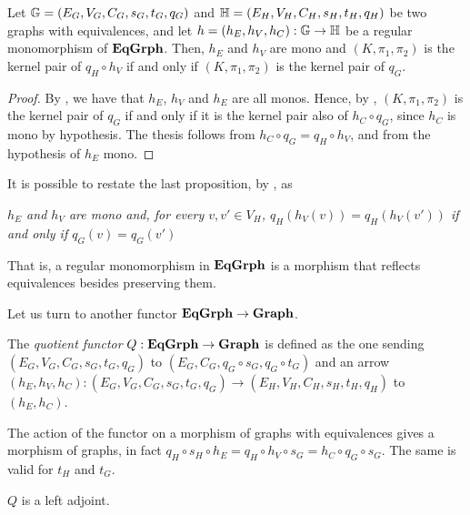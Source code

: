 \begin{prop}
	Let $\mathbb{G} = (E_G, V_G, C_G, s_G, t_G, q_G)$ and $\mathbb{H} = (E_H, V_H, C_H, s_H, t_H, q_H)$ be two graphs with equivalences,
	and let $ h = (h_E, h_V, h_C): \mathbb{G}\to \mathbb{H} $ be a regular monomorphism of $\mathbf{EqGrph}$. Then, $h_E$ and $h_V$ are mono and $(K, \pi_1, \pi_2)$ is the kernel pair of $q_H \circ h_V$ if and only if $(K, \pi_1, \pi_2)$ is the kernel pair of $q_G$.
\end{prop}

\begin{proof}
	By , we have that $h_E$, $h_V$ and $h_E$ are all monos. Hence, by , $(K, \pi_1, \pi_2)$ is the kernel pair of $q_G$ if and only if it is the kernel pair also of $h_C \circ q_G$, since $h_C$ is mono by hypothesis. The thesis follows from $h_C \circ q_G = q_H \circ h_V$, and from the hypothesis of $h_E$ mono.

\end{proof}

\begin{remark}
    It is possible to restate the last proposition, by , as 
    \begin{displayquote}
    \textit{$h_E$ and $h_V$ are mono and, for every $v, v'\in V_H$, $q_H(h_V(v))=q_H(h_V(v'))$ if and only if $q_G(v)=q_G(v')$}
    \end{displayquote}
    That is, a regular monomorphism in $\mathbf{EqGrph}$ is a morphism that reflects equivalences besides preserving them.
\end{remark}

Let us turn to another functor $\mathbf{EqGrph}\to \mathbf{Graph}$.

\begin{definition}
The \emph{quotient functor} $Q:\mathbf{EqGrph}\to \mathbf{Graph} $ is defined as the one sending $(E_G, V_G, C_G, s_G, t_G, q_G)$ to $(E_G, C_G, q_G\circ s_G, q_G\circ t_G)$ and an arrow $(h_E, h_V, h_C) \colon (E_G, V_G, C_G, s_G, t_G, q_G)\to (E_H, V_H, C_H, s_H, t_H, q_H)$ to $(h_E, h_C)$.
\end{definition}

\begin{remark}
    The action of the functor on a morphism of graphs with equivalences gives a morphism of graphs, in fact $q_H \circ s_H \circ h_E = q_H \circ h_V \circ s_G = h_C \circ q_G \circ s_G$. The same is valid for $t_H$ and $t_G$. 
\end{remark}

\begin{lemma}\label{lemma:quot_funct_left_adj}
    $Q$ is a left adjoint.
\end{lemma}

